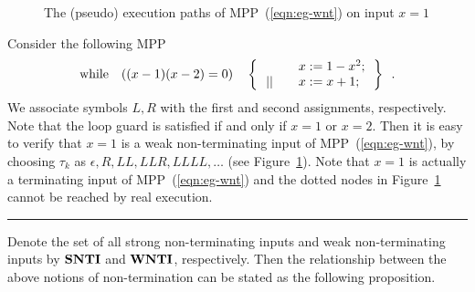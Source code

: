 \documentclass{jssc}
\newcommand{\rulex}{\hfill\rule{1mm}{3mm}}
\newcommand{\while}{{\rm while}}
\newcommand{\SNTI}{{\bf SNTI}}
\newcommand{\WNTI}{{\bf WNTI}}
\begin{document}
\begin{figure}
\begin{minipage}[t]{0.45\linewidth}

\caption{\small The (pseudo) execution paths of MPP~(\ref{eqn:eg-wnt}) on input $x=1$}\label{fig:eg-wnt}
\end{minipage}
\end{figure}

\begin{example}\label{eg:wnt}
Consider the following MPP
\begin{equation}\label{eqn:eg-wnt}
\while \quad ((x-1)(x-2)=0) \quad \left\{
\begin{array}{ll}
& \quad x := 1-x^2; \\
\,|| & \quad x := x+1; \\
\end{array}
\,\right\} \enspace .
\end{equation}
We associate symbols $L,R$ with the first and second assignments, respectively. Note that the loop guard is satisfied if and only if $x=1$ or $x=2$. Then it is easy to verify that $x=1$ is a weak non-terminating input of MPP~(\ref{eqn:eg-wnt}), by choosing $\tau_k$ as $\epsilon, R, LL, LLR, LLLL, \ldots$ (see Figure~\ref{fig:eg-wnt}).
Note that $x=1$ is actually a terminating input of MPP~(\ref{eqn:eg-wnt}) and the dotted nodes in Figure~\ref{fig:eg-wnt} cannot be reached by real execution. \rulex
\end{example}

Denote the set of all strong non-terminating inputs and weak non-terminating inputs by $\SNTI$ and $\WNTI$, respectively. Then the relationship between the above notions of non-termination can be stated as the following proposition.
\end{document}
